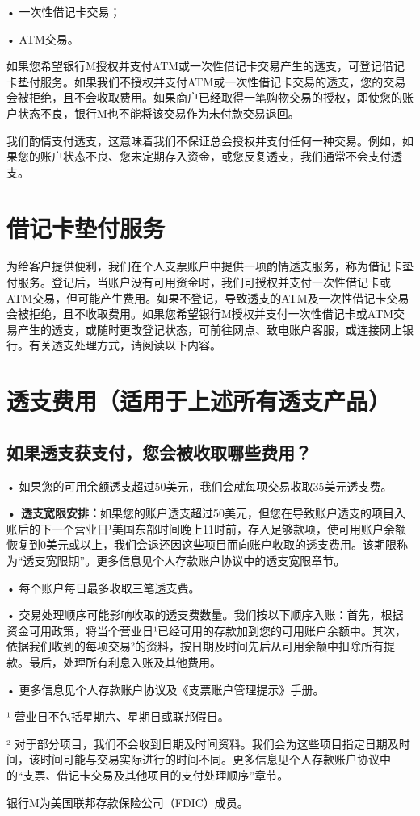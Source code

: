 \documentclass[UTF8,fontset=none,11pt,a4paper]{ctexart}
\begin{document}
• 一次性借\allowbreak\mbox{记卡交易；}


• ATM交易。


如果您希望银行M授权并支付ATM或一次性借记卡交易产生的透支，可登记借记卡垫付服务。如果我们不授权并支付ATM或一次性借记卡交易的透支，您的交易会被拒绝，且不会收取费用。如果商户已经取得一笔购物交易的授权，即使您的账户状态不良，银行M也不能将该交易作为未付款\allowbreak\mbox{交易退回。}


我们酌情支付透支，这意味着我们不保证总会授权并支付任何一种交易。例如，如果您的账户状态不良、您未定期存入资金，或您反复透支，我们通常不会\allowbreak\mbox{支付透支。}


\section*{借记卡垫付服务}
为给客户提供便利，我们在个人支票账户中提供一项酌情透支服务，称为借记卡垫付服务。登记后，当账户没有可用资金时，我们可授权并支付一次性借记卡或ATM交易，但可能产生费用。如果不登记，导致透支的ATM及一次性借记卡交易会被拒绝，且不收取费用。如果您希望银行M授权并支付一次性借记卡或ATM交易产生的透支，或随时更改登记状态，可前往网点、致电账户客服，或连接网上银行。有关透支处理方式，请阅读\allowbreak\mbox{以下内容。}


\section*{透支费用（适用于上述所有透支产品）}
\subsection*{如果透支获支付，您会被收取哪些费用？}
• 如果您的可用余额透支超过50美元，我们会就每项交易收取35美\allowbreak\mbox{元透支费。}


\textbf{• 透支宽限安排：}如果您的账户透支超过50美元，但您在导致账户透支的项目入账后的下一个营业日¹美国东部时间晚上11时前，存入足够款项，使可用账户余额恢复到0美元或以上，我们会退还因这些项目而向账户收取的透支费用。该期限称为“透支宽限期”。更多信息见个人存款账户协议中的透支\allowbreak\mbox{宽限章节。}


• 每个账户每日最多收取三\allowbreak\mbox{笔透支费。}


• 交易处理顺序可能影响收取的透支费数量。我们按以下顺序入账：首先，根据资金可用政策，将当个营业日¹已经可用的存款加到您的可用账户余额中。其次，依据我们收到的每项交易²的资料，按日期及时间先后从可用余额中扣除所有提款。最后，处理所有利息入账及\allowbreak\mbox{其他费用。}


• 更多信息见个人存款账户协议及《支票账户管理提示》手册。


¹ 营业日不包括星期六、星期日或\allowbreak\mbox{联邦假日。}


² 对于部分项目，我们不会收到日期及时间资料。我们会为这些项目指定日期及时间，该时间可能与交易实际进行的时间不同。更多信息见个人存款账户协议中的“支票、借记卡交易及其他项目的支付处理顺序”章节。


银行M为美国联邦存款保险公司（FDIC）成员。
\end{document}
